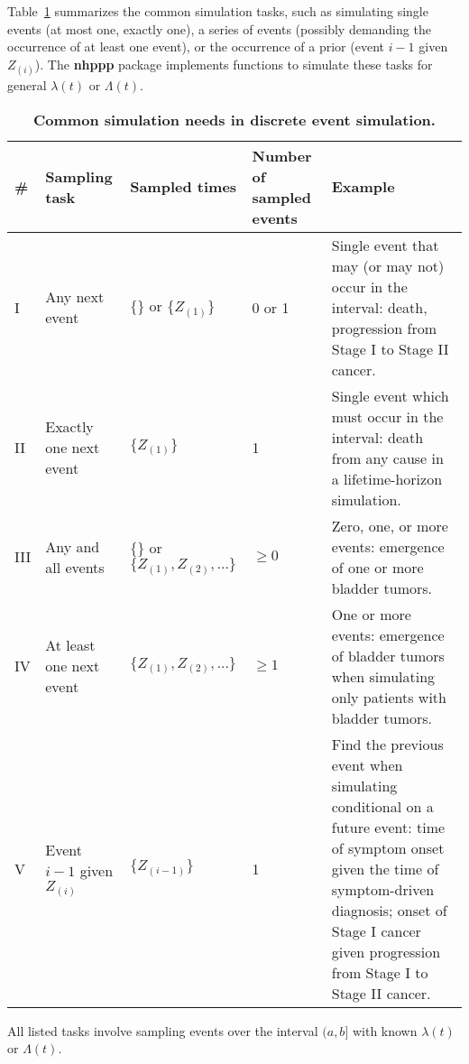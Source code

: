 \documentclass[10pt,letterpaper]{article}
\newcommand{\pkg}[1]{{\bf #1}}
\begin{document}
Table~\ref{tab:simtasks} summarizes the common simulation tasks, such as simulating single events (at most one, exactly one), a series of events (possibly demanding the occurrence of at least one event), or the occurrence of a prior (event $i-1$ given $Z_{(i)}$). The \pkg{nhppp} package implements functions to simulate these tasks for general $\lambda(t)$ or $\Lambda(t)$.

\begin{table}[ht!]
\begin{adjustwidth}{-1.25in}{0in}
    \centering
    \caption{\textbf{Common simulation needs in discrete event simulation.}}
    \begin{tabular}{lp{2cm}lp{1.8cm}p{6cm}}
    \toprule
    \textbf{\#} & \textbf{Sampling task} & \textbf{Sampled times} & \textbf{Number of sampled events} & \textbf{Example}  \\ 
    \midrule
    I & Any next event&  $\{\}$  or $\{Z_{(1)}\}$&  0 or 1& Single event that may (or may not) occur in the interval: death, progression from Stage I to Stage II cancer. \\ 
    \addlinespace
    II & Exactly one next event&  $\{Z_{(1)} \}$&  1& Single event which must occur in the interval: death from any cause in a lifetime-horizon simulation. \\ 
    \addlinespace
    III & Any and all events&  $\{\}$ or $\{Z_{(1)}, Z_{(2)}, \dots \}$&  $\ge 0$& Zero, one, or more events: emergence of one or more bladder tumors. \\ 
    \addlinespace
    IV & At least one next event&  $\{Z_{(1)} , Z_{(2)}, \dots \}$&  $\ge 1$& One or more events: emergence of bladder tumors when simulating only patients with bladder tumors. \\ 
    \addlinespace
    V & Event $i-1$ given $Z_{(i)}$ & $\{Z_{(i-1)}\}$ & 1 & Find the previous event when simulating conditional on a future event: time of symptom onset given the time of symptom-driven diagnosis; onset of Stage I cancer given progression from Stage I to Stage II cancer. \\ 
    \bottomrule
    \end{tabular}
    \label{tab:simtasks}
    \begin{flushleft} All listed tasks involve sampling events over the interval $(a, b]$ with known $\lambda(t)$ or $\Lambda(t)$.
\end{flushleft}
\end{adjustwidth}
\end{table}
\end{document}
